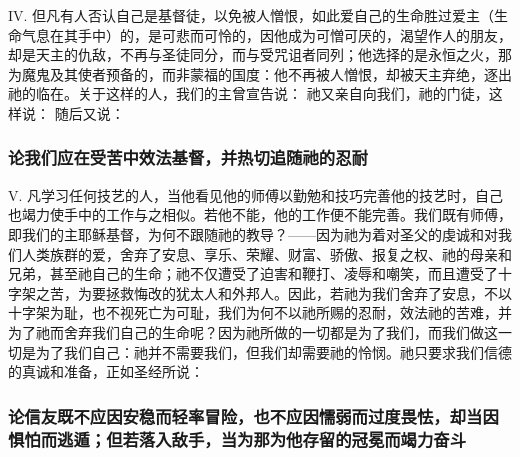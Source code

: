 IV. 但凡有人否认自己是基督徒，以免被人憎恨，如此爱自己的生命胜过爱主（生命气息在其手中）的，是可悲而可怜的，因他成为可憎可厌的，渴望作人的朋友，却是天主的仇敌，不再与圣徒同分，而与受咒诅者同列；他选择的是永恒之火，那为魔鬼及其使者预备的，而非蒙福的国度：他不再被人憎恨，却被天主弃绝，逐出祂的临在。关于这样的人，我们的主曾宣告说： 祂又亲自向我们，祂的门徒，这样说： 随后又说：\par


\subsubsection{论我们应在受苦中效法基督，并热切追随祂的忍耐}

V. 凡学习任何技艺的人，当他看见他的师傅以勤勉和技巧完善他的技艺时，自己也竭力使手中的工作与之相似。若他不能，他的工作便不能完善。我们既有师傅，即我们的主耶稣基督，为何不跟随祂的教导？——因为祂为着对圣父的虔诚和对我们人类族群的爱，舍弃了安息、享乐、荣耀、财富、骄傲、报复之权、祂的母亲和兄弟，甚至祂自己的生命；祂不仅遭受了迫害和鞭打、凌辱和嘲笑，而且遭受了十字架之苦，为要拯救悔改的犹太人和外邦人。因此，若祂为我们舍弃了安息，不以十字架为耻，也不视死亡为可耻，我们为何不以祂所赐的忍耐，效法祂的苦难，并为了祂而舍弃我们自己的生命呢？因为祂所做的一切都是为了我们，而我们做这一切是为了我们自己：祂并不需要我们，但我们却需要祂的怜悯。祂只要求我们信德的真诚和准备，正如圣经所说：\par


\subsubsection{论信友既不应因安稳而轻率冒险，也不应因懦弱而过度畏怯，却当因惧怕而逃遁；但若落入敌手，当为那为他存留的冠冕而竭力奋斗}

